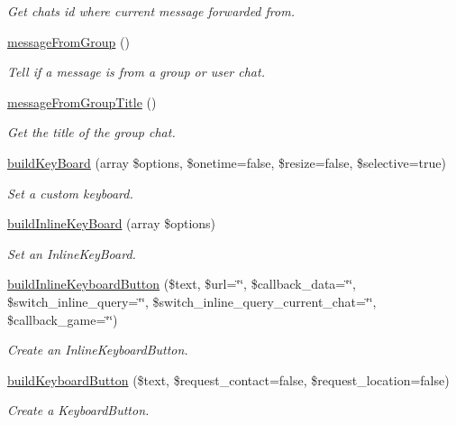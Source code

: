 \begin{DoxyCompactItemize}
\begin{DoxyCompactList}\small\item\em Get chat\textquotesingle{}s id where current message forwarded from. \end{DoxyCompactList}\item 
\hyperlink{class_telegram_a59b7bf91ea3b26d732f7536c2d65da19}{message\+From\+Group} ()
\begin{DoxyCompactList}\small\item\em Tell if a message is from a group or user chat. \end{DoxyCompactList}\item 
\hyperlink{class_telegram_acd2c4c8c6f15dbb1f25af2f539c2ec16}{message\+From\+Group\+Title} ()
\begin{DoxyCompactList}\small\item\em Get the title of the group chat. \end{DoxyCompactList}\item 
\hyperlink{class_telegram_a5c9619923ae1810aa340fa0e9acc1744}{build\+Key\+Board} (array \$options, \$onetime=false, \$resize=false, \$selective=true)
\begin{DoxyCompactList}\small\item\em Set a custom keyboard. \end{DoxyCompactList}\item 
\hyperlink{class_telegram_a81212e5e1fe0b3f72dd503a71577bbc4}{build\+Inline\+Key\+Board} (array \$options)
\begin{DoxyCompactList}\small\item\em Set an Inline\+Key\+Board. \end{DoxyCompactList}\item 
\hyperlink{class_telegram_a01432df36d1939f6c8dc09501f4ffcd3}{build\+Inline\+Keyboard\+Button} (\$text, \$url=\char`\"{}\char`\"{}, \$callback\+\_\+data=\char`\"{}\char`\"{}, \$switch\+\_\+inline\+\_\+query=\char`\"{}\char`\"{}, \$switch\+\_\+inline\+\_\+query\+\_\+current\+\_\+chat=\char`\"{}\char`\"{}, \$callback\+\_\+game=\char`\"{}\char`\"{})
\begin{DoxyCompactList}\small\item\em Create an Inline\+Keyboard\+Button. \end{DoxyCompactList}\item 
\hyperlink{class_telegram_a611a52a2e9be838207b3943007a76b6c}{build\+Keyboard\+Button} (\$text, \$request\+\_\+contact=false, \$request\+\_\+location=false)
\begin{DoxyCompactList}\small\item\em Create a Keyboard\+Button. \end{DoxyCompactList}\item 

\end{DoxyCompactItemize}
